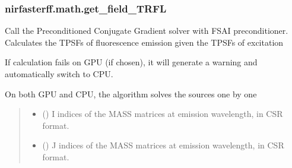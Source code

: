\documentclass[letterpaper,10pt,english]{sphinxmanual}
\begin{document}
\sphinxstepscope


\subsubsection{nirfasterff.math.get\_field\_TRFL}
\label{\detokenize{_autosummary/nirfasterff.math.get_field_TRFL:nirfasterff-math-get-field-trfl}}\label{\detokenize{_autosummary/nirfasterff.math.get_field_TRFL::doc}}

\begin{fulllineitems}
\label{\detokenize{_autosummary/nirfasterff.math.get_field_TRFL:nirfasterff.math.get_field_TRFL}}
\pysigstartsignatures
\pysiglinewithargsret
{}
{\sphinxparamcomma {}\sphinxparamcomma {}\sphinxparamcomma {}\sphinxparamcomma {}\sphinxparamcomma {}\sphinxparamcomma {}\sphinxparamcomma {}}
{}
\pysigstopsignatures
\sphinxAtStartPar
Call the Preconditioned Conjugate Gradient solver with FSAI preconditioner. Calculates the TPSFs of fluorescence emission given the TPSFs of excitation

\sphinxAtStartPar
If calculation fails on GPU (if chosen), it will generate a warning and automatically switch to CPU.

\sphinxAtStartPar
On both GPU and CPU, the algorithm solves the sources one by one
\begin{quote}\begin{description}
\begin{itemize}
\item {} 
\sphinxAtStartPar
{} (\sphinxstyleliteralemphasis{\sphinxupquote{, }}) \textendash{} I indices of the MASS matrices at emission wavelength, in CSR format.

\item {} 
\sphinxAtStartPar
{} (\sphinxstyleliteralemphasis{\sphinxupquote{, }}) \textendash{} J indices of the MASS matrices at emission wavelength, in CSR format.


\end{itemize}
\end{description}
\end{quote}
\end{fulllineitems}
\end{document}
